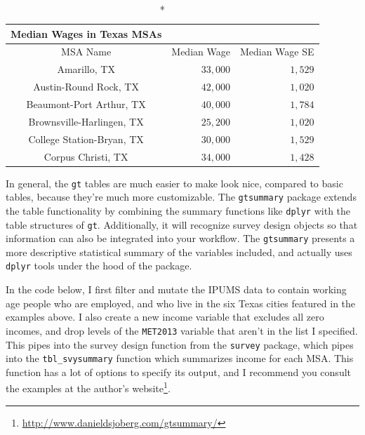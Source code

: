 \documentclass[
]{article}
\begin{document}
\captionsetup[table]{labelformat=empty,skip=1pt}
\begin{longtable}{crr}
\caption*{
{\large Median Wages in Texas MSAs}
} \\ 
\toprule
MSA Name & Median Wage & Median Wage SE \\ 
\midrule
Amarillo, TX & $33,000$ & $1,529$ \\ 
Austin-Round Rock, TX & $42,000$ & $1,020$ \\ 
Beaumont-Port Arthur, TX & $40,000$ & $1,784$ \\ 
Brownsville-Harlingen, TX & $25,200$ & $1,020$ \\ 
College Station-Bryan, TX & $30,000$ & $1,529$ \\ 
Corpus Christi, TX & $34,000$ & $1,428$ \\ 
 \bottomrule
\end{longtable}

In general, the \texttt{gt} tables are much easier to make look nice, compared to basic tables, because they're much more customizable. The \texttt{gtsummary} package extends the table functionality by combining the summary functions like \texttt{dplyr} with the table structures of \texttt{gt}. Additionally, it will recognize survey design objects so that information can also be integrated into your workflow. The \texttt{gtsummary} presents a more descriptive statistical summary of the variables included, and actually uses \texttt{dplyr} tools under the hood of the package.

In the code below, I first filter and mutate the IPUMS data to contain working age people who are employed, and who live in the six Texas cities featured in the examples above. I also create a new income variable that excludes all zero incomes, and drop levels of the \texttt{MET2013} variable that aren't in the list I specified. This pipes into the survey design function from the \texttt{survey} package, which pipes into the \texttt{tbl\_svysummary} function which summarizes income for each MSA. This function has a lot of options to specify its output, and I recommend you consult the examples at the author's website\footnote{\url{http://www.danieldsjoberg.com/gtsummary/}}.
\end{document}
